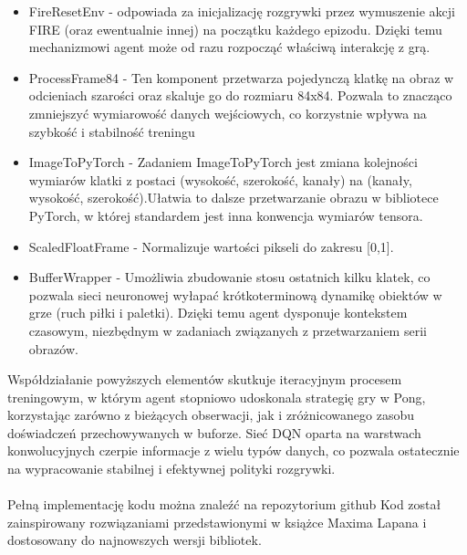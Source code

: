 \documentclass[a4paper, 12pt]{article}
\numberwithin{equation}{section}
\begin{document}
\begin{itemize}
        \item FireResetEnv - odpowiada za inicjalizację rozgrywki przez wymuszenie akcji FIRE (oraz ewentualnie innej) na początku każdego epizodu. Dzięki temu mechanizmowi agent może od razu rozpocząć właściwą interakcję z grą.
        \item ProcessFrame84 - Ten komponent przetwarza pojedynczą klatkę na obraz w odcieniach szarości oraz skaluje go do rozmiaru 84x84. Pozwala to znacząco zmniejszyć wymiarowość danych wejściowych, co korzystnie wpływa na szybkość i stabilność treningu
        \item ImageToPyTorch - Zadaniem ImageToPyTorch jest zmiana kolejności wymiarów klatki z postaci (wysokość, szerokość, kanały) na (kanały, wysokość, szerokość).Ułatwia to dalsze przetwarzanie obrazu w bibliotece PyTorch, w której standardem jest inna konwencja wymiarów tensora.
        \item ScaledFloatFrame - Normalizuje wartości pikseli do zakresu [0,1].
        \item BufferWrapper - Umożliwia zbudowanie stosu ostatnich kilku klatek, co pozwala sieci neuronowej wyłapać krótkoterminową dynamikę obiektów w grze (ruch piłki i paletki). Dzięki temu agent dysponuje kontekstem czasowym, niezbędnym w zadaniach związanych z przetwarzaniem serii obrazów.
    \end{itemize}
    Współdziałanie powyższych elementów skutkuje iteracyjnym procesem treningowym, w którym agent stopniowo udoskonala strategię gry w Pong, korzystając zarówno z bieżących obserwacji, jak i zróżnicowanego zasobu doświadczeń przechowywanych w buforze. Sieć DQN oparta na warstwach konwolucyjnych czerpie informacje z wielu typów danych, co pozwala ostatecznie na wypracowanie stabilnej i efektywnej polityki rozgrywki.
    \\ \\ 
    Pełną implementację kodu można znaleźć na repozytorium github \cite{DQN}
    Kod został zainspirowany rozwiązaniami przedstawionymi w książce Maxima Lapana \cite{lapan2020deep} i dostosowany do najnowszych wersji bibliotek.
\end{document}
